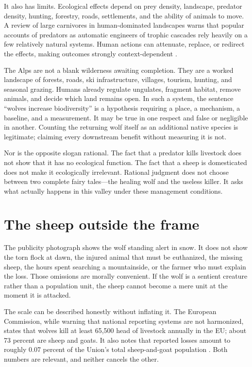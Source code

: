 ﻿\documentclass[12pt,a4paper]{book}
\begin{document}
It also has limits.  Ecological effects depend on prey density, landscape,
predator density, hunting, forestry, roads, settlements, and the ability of
animals to move.  A review of large carnivores in human-dominated landscapes
warns that popular accounts of predators as automatic engineers of trophic
cascades rely heavily on a few relatively natural systems.  Human actions can
attenuate, replace, or redirect the effects, making outcomes strongly
context-dependent \cite{KuijperCarnivores2016}.

The Alps are not a blank wilderness awaiting completion.  They are a worked
landscape of forests, roads, ski infrastructure, villages, tourism, hunting,
and seasonal grazing.  Humans already regulate ungulates, fragment habitat,
remove animals, and decide which land remains open.  In such a system, the
sentence ``wolves increase biodiversity'' is a hypothesis requiring a place,
a mechanism, a baseline, and a measurement.  It may be true in one respect
and false or negligible in another.  Counting the returning wolf itself as an
additional native species is legitimate; claiming every downstream benefit
without measuring it is not.

Nor is the opposite slogan rational.  The fact that a predator kills livestock
does not show that it has no ecological function.  The fact that a sheep is
domesticated does not make it ecologically irrelevant.  Rational judgment
does not choose between two complete fairy tales---the healing wolf and the
useless killer.  It asks what actually happens in this valley under these
management conditions.

\section{The sheep outside the frame}

The publicity photograph shows the wolf standing alert in snow.  It does not
show the torn flock at dawn, the injured animal that must be euthanized, the
missing sheep, the hours spent searching a mountainside, or the farmer who
must explain the loss.  Those omissions are morally convenient.  If the wolf
is a sentient creature rather than a population unit, the sheep cannot become
a mere unit at the moment it is attacked.

The scale can be described honestly without inflating it.  The European
Commission, while warning that national reporting systems are not harmonized,
states that wolves kill at least 65,500 head of livestock annually in the EU;
about 73 percent are sheep and goats.  It also notes that reported losses
amount to roughly 0.07 percent of the Union's total sheep-and-goat population
\cite{ECLargeCarnivoreFacts2026}.  Both numbers are relevant, and neither
cancels the other.
\end{document}

